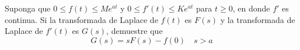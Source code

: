 \item Suponga que $0 \le f(t) \le M e^{at}$ y $0 \le f'(t) \le K e^{at}$ para $t \ge 0$, en donde $f'$ es continua. Si la transformada de Laplace de $f(t)$ es $F(s)$ y la transformada de Laplace de $f'(t)$ es $G(s)$, demuestre que
    \[ G(s) = sF(s) - f(0) \quad s > a \]
